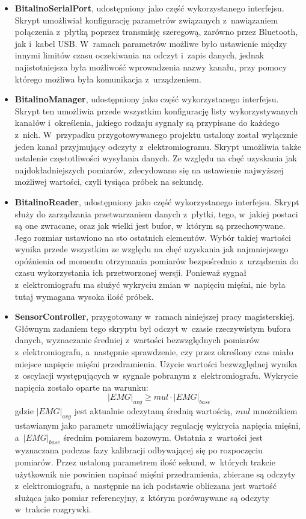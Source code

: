 \begin{itemize}
	\item \textbf{BitalinoSerialPort}, udostępniony jako część wykorzystanego interfejsu. Skrypt umożliwiał konfigurację parametrów związanych z~nawiązaniem połączenia z~płytką poprzez transmisję szeregową, zarówno przez Bluetooth, jak i~kabel USB. W~ramach parametrów możliwe było ustawienie między innymi limitów czasu oczekiwania na odczyt i~zapis danych, jednak najistotniejsza była możliwość wprowadzenia nazwy kanału, przy pomocy którego możliwa była komunikacja z~urządzeniem. 
	\item \textbf{BitalinoManager}, udostępniony jako część wykorzystanego interfejsu. Skrypt ten umożliwia przede wszystkim konfigurację listy wykorzystywanych kanałów i~określenia, jakiego rodzaju sygnały są przypisane do każdego z~nich. W~przypadku przygotowywanego projektu ustalony został wyłącznie jeden kanał przyjmujący odczyty z~elektromiogramu. Skrypt umożliwia także ustalenie częstotliwości wysyłania danych. Ze względu na chęć uzyskania jak najdokładniejszych pomiarów, zdecydowano się na ustawienie najwyższej możliwej wartości, czyli tysiąca próbek na sekundę.
	\item \textbf{BitalinoReader}, udostępniony jako część wykorzystanego interfejsu. Skrypt służy do zarządzania przetwarzaniem danych z~płytki, tego, w~jakiej postaci są one zwracane, oraz jak wielki jest bufor, w~którym są przechowywane. Jego rozmiar ustawiono na sto ostatnich elementów. Wybór takiej wartości wynika przede wszystkim ze względu na chęć uzyskania jak najmniejszego opóźnienia od momentu otrzymania pomiarów bezpośrednio z~urządzenia do czasu wykorzystania ich przetworzonej wersji. Ponieważ sygnał z~elektromiografu ma służyć wykryciu zmian w~napięciu mięśni, nie była tutaj wymagana wysoka ilość próbek.
	\item \textbf{SensorController}, przygotowany w~ramach niniejszej pracy magisterskiej. Głównym zadaniem tego skryptu był odczyt w~czasie rzeczywistym bufora danych, wyznaczanie średniej z~wartości bezwzględnych pomiarów z~elektromiografu, a~następnie sprawdzenie, czy przez określony czas miało miejsce napięcie mięśni przedramienia. Użycie wartości bezwzględnej wynika z~oscylacji występujących w~sygnale pobranym z~elektromiografu. Wykrycie napięcia zostało oparte na warunku:
	$$
	|EMG|_{avg} \geq mul \cdot |EMG|_{base}
	$$
	gdzie $|EMG|_{avg}$ jest aktualnie odczytaną średnią wartością, $mul$ mnożnikiem ustawianym jako parametr umożliwiający regulację wykrycia napięcia mięśni, a~$|EMG|_{base}$ średnim pomiarem bazowym. Ostatnia z~wartości jest wyznaczana podczas fazy kalibracji odbywającej się po rozpoczęciu pomiarów. Przez ustaloną parametrem ilość sekund, w~których trakcie użytkownik nie powinien napinać mięśni przedramienia, zbierane są odczyty z~elektromiografu, a~następnie na ich podstawie obliczana jest wartość służąca jako pomiar referencyjny, z~którym porównywane są odczyty w~trakcie rozgrywki.
\end{itemize}
